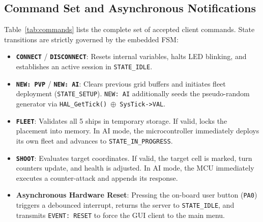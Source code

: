\subsection{Command Set and Asynchronous Notifications}
Table~\ref{tab:commands} lists the complete set of accepted client commands. State transitions are strictly governed by the embedded FSM:
\begin{itemize}
    \item \textbf{\texttt{CONNECT}} / \textbf{\texttt{DISCONNECT}}: Resets internal variables, halts LED blinking, and establishes an active session in \texttt{STATE\_IDLE}.
    \item \textbf{\texttt{NEW: PVP}} / \textbf{\texttt{NEW: AI}}: Clears previous grid buffers and initiates fleet deployment (\texttt{STATE\_SETUP}). \texttt{NEW: AI} additionally seeds the pseudo-random generator via \texttt{HAL\_GetTick() $\oplus$ SysTick->VAL}.
    \item \textbf{\texttt{FLEET}}: Validates all 5 ships in temporary storage. If valid, locks the placement into memory. In AI mode, the microcontroller immediately deploys its own fleet and advances to \texttt{STATE\_IN\_PROGRESS}.
    \item \textbf{\texttt{SHOOT}}: Evaluates target coordinates. If valid, the target cell is marked, turn counters update, and health is adjusted. In AI mode, the MCU immediately executes a counter-attack and appends its response.
    \item \textbf{Asynchronous Hardware Reset}: Pressing the on-board user button (\texttt{PA0}) triggers a debounced interrupt, returns the server to \texttt{STATE\_IDLE}, and transmits \texttt{EVENT: RESET} to force the GUI client to the main menu.
\end{itemize}

